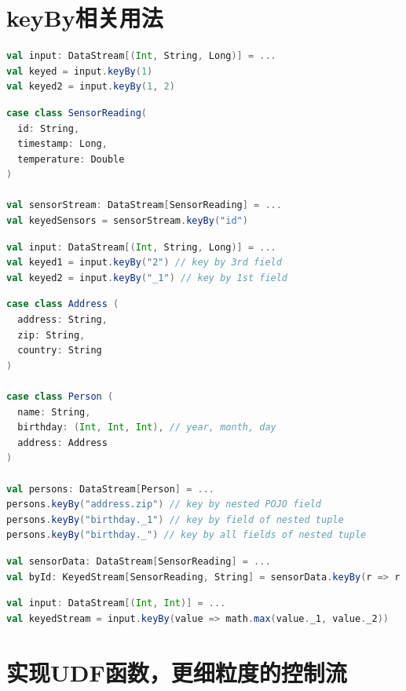 \documentclass[oneside]{ctexbook}
\begin{document}
\section{keyBy相关用法}

\begin{lstlisting}[language=scala]
val input: DataStream[(Int, String, Long)] = ...
val keyed = input.keyBy(1)
val keyed2 = input.keyBy(1, 2)
\end{lstlisting}

\begin{lstlisting}[language=scala]
case class SensorReading(
  id: String,
  timestamp: Long,
  temperature: Double
)

val sensorStream: DataStream[SensorReading] = ...
val keyedSensors = sensorStream.keyBy("id")
\end{lstlisting}

\begin{lstlisting}[language=scala]
val input: DataStream[(Int, String, Long)] = ...
val keyed1 = input.keyBy("2") // key by 3rd field
val keyed2 = input.keyBy("_1") // key by 1st field
\end{lstlisting}

\begin{lstlisting}[language=scala]
case class Address (
  address: String,
  zip: String,
  country: String
)

case class Person (
  name: String,
  birthday: (Int, Int, Int), // year, month, day
  address: Address
)

val persons: DataStream[Person] = ...
persons.keyBy("address.zip") // key by nested POJO field
persons.keyBy("birthday._1") // key by field of nested tuple
persons.keyBy("birthday._") // key by all fields of nested tuple
\end{lstlisting}

\begin{lstlisting}[language=scala, breaklines]
val sensorData: DataStream[SensorReading] = ...
val byId: KeyedStream[SensorReading, String] = sensorData.keyBy(r => r.id)
\end{lstlisting}

\begin{lstlisting}[language=scala, breaklines]
val input: DataStream[(Int, Int)] = ...
val keyedStream = input.keyBy(value => math.max(value._1, value._2))
\end{lstlisting}

\section{实现UDF函数，更细粒度的控制流}
\end{document}

